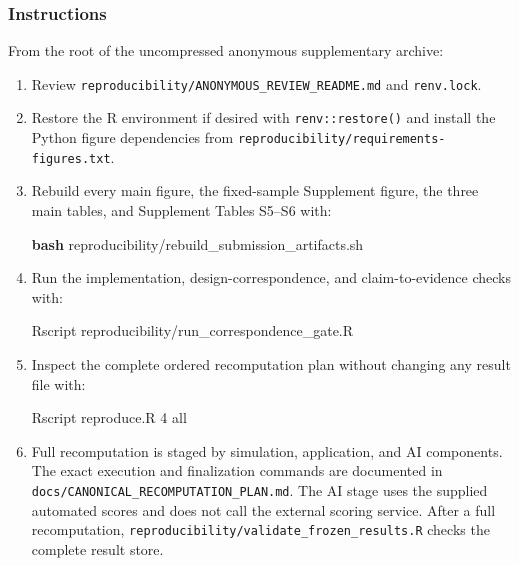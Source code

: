 \documentclass[
  10pt,
]{article}
\newenvironment{Shaded}{\begin{snugshade}}{\end{snugshade}}
\newcommand{\ExtensionTok}[1]{#1}
\newcommand{\FunctionTok}[1]{\textcolor[rgb]{0.13,0.29,0.53}{\textbf{#1}}}
\newcommand{\NormalTok}[1]{#1}
\begin{document}
\subsubsection{Instructions}\label{instructions}

From the root of the uncompressed anonymous supplementary archive:

\begin{enumerate}
\def\labelenumi{\arabic{enumi}.}
\item
  Review \texttt{reproducibility/ANONYMOUS\_REVIEW\_README.md} and
  \texttt{renv.lock}.
\item
  Restore the R environment if desired with \texttt{renv::restore()} and
  install the Python figure dependencies from
  \texttt{reproducibility/requirements-figures.txt}.
\item
  Rebuild every main figure, the fixed-sample Supplement figure, the
  three main tables, and Supplement Tables S5--S6 with:

\begin{Shaded}
\begin{Highlighting}[]
\FunctionTok{bash}\NormalTok{ reproducibility/rebuild\_submission\_artifacts.sh}
\end{Highlighting}
\end{Shaded}
\item
  Run the implementation, design-correspondence, and claim-to-evidence
  checks with:

\begin{Shaded}
\begin{Highlighting}[]
\ExtensionTok{Rscript}\NormalTok{ reproducibility/run\_correspondence\_gate.R}
\end{Highlighting}
\end{Shaded}
\item
  Inspect the complete ordered recomputation plan without changing any
  result file with:

\begin{Shaded}
\begin{Highlighting}[]
\ExtensionTok{Rscript}\NormalTok{ reproduce.R 4 all}
\end{Highlighting}
\end{Shaded}
\item
  Full recomputation is staged by simulation, application, and AI
  components. The exact execution and finalization commands are
  documented in \texttt{docs/CANONICAL\_RECOMPUTATION\_PLAN.md}. The AI
  stage uses the supplied automated scores and does not call the
  external scoring service. After a full recomputation,
  \texttt{reproducibility/validate\_frozen\_results.R} checks the
  complete result store.
\end{enumerate}
\end{document}
